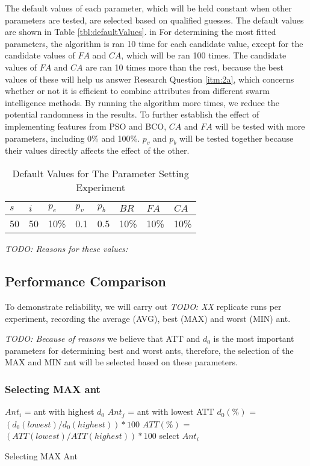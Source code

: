 The default values of each parameter, which will be held constant when other parameters are tested, are selected based on qualified guesses. The default values are shown in Table \vref{tbl:defaultValues}. in For determining the most fitted parameters, the algorithm is ran 10 time for each candidate value, except for the candidate values of $FA$ and $CA$, which will be ran 100 times. The candidate values of $FA$ and $CA$ are ran 10 times more than the rest, because the best values of these will help us answer Research Question \vref{itm:2a}, which concerns whether or not it is efficient to combine attributes from different swarm intelligence methods. By running the algorithm more times, we reduce the potential randomness in the results. To further establish the effect of implementing features from PSO and BCO, $CA$ and $FA$ will be tested with more parameters, including 0\% and 100\%. $p_{v}$ and $p_{b}$ will be tested together because their values directly affects the effect of the other. 

\begin{table}[H]
\label{tbl:defaultValues}
	\centering
    \begin{tabular}{|l|l|l|l|l|l|l|l|}
 	\hline
 	$s$ & $i$ & $p_{e}$ & $p_{v}$ & $p_{b}$ & $BR$  & $FA$ & $CA$  \\
 	\hline
    50 & 50 & 10\% & 0.1 & 0.5 & 10\% & 10\%  & 10\%  \\
	\hline
    \end{tabular}
    \caption {Default Values for The Parameter Setting Experiment} \emph{\color{blue} TODO: Reasons for these values:}
    \label{table:parameter_startvalues}
	\end{table}

\subsection{Performance Comparison}

To demonstrate reliability, we will carry out \emph{\color{blue} TODO: XX } replicate runs per experiment, recording the average (AVG), best (MAX) and worst (MIN) ant.  

\emph{\color{blue} TODO: Because of reasons }we believe that ATT and $d_0$ is the most important parameters for determining best and worst ants, therefore, the selection of the MAX and MIN ant will be selected based on these parameters. 

\subsubsection{Selecting MAX ant}
\begin{algorithm}[H]
$Ant_{i}$ = ant with highest $d_0$\;
$Ant_{j}$ = ant with lowest ATT\;
{
	$d_0(\%)$ = $(d_0(lowest) / d_0(highest))*100$\;
	$ATT(\%)$ = $(ATT(lowest) / ATT(highest))*100$\;
	{
		select $Ant_{i}$
	}
}
 \caption{Selecting MAX Ant}
\end{algorithm}


